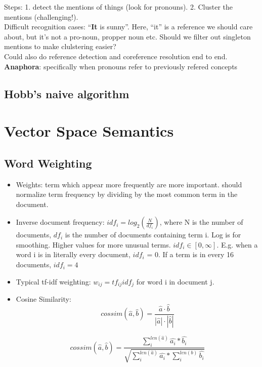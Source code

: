 \documentclass[]{article}
\begin{document}
	Steps: 1. detect the mentions of things (look for pronouns). 2. Cluster the mentions (challenging!). \\
	
	Difficult recognition cases: ``\textbf{It} is sunny''. Here, ``it'' is a reference we should care about, but it's not a pro-noun, propper noun etc. Should we filter out singleton mentions to make clulstering easier? \\
	
	Could also do reference detection and coreference resolution end to end.\\

	\textbf{Anaphora}: specifically when pronouns refer to previously refered concepts
	
	\subsection{Hobb's naive algorithm}
	
	\clearpage
	\section{Vector Space Semantics}
    
    \subsection{Word Weighting}
    
    \begin{itemize}
     \item Weights: term which appear more frequently  are more important. should normalize term frequency by dividing by the most common term in the document.
     \item Inverse document frequency: $idf_i = log_2(\frac{N}{df_i})$, where N is the number of documents, $df_i$ is the number of documents containing term i. Log is for smoothing. Higher values for more unusual terms. $idf_i \in [0, \infty]$. E.g. when a word i is in literally every document, $idf_i$ = 0. If a term is in every 16 documents, $idf_i = 4$
     \item Typical tf-idf weighting: $w_{ij} = tf_{ij}idf_j$ for word i in document j.
     \item Cosine Similarity: $$cossim(\hat{a}, \hat{b}) = \frac{\hat{a} \cdot \hat{b}}{|\hat{a}| \cdot |\hat{b}|}$$
     
     $$cossim(\hat{a}, \hat{b}) 
     = \frac
     {\sum_i^{len(\hat{a})} \hat{a_i} * \hat{b_i}}
     {\sqrt{\sum_i^{len(\hat{a})}\hat{a_i} * \sum_i^{len(b)}\hat{b_i}}}$$
     
    \end{itemize}
\end{document}
